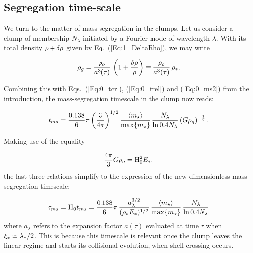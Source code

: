\subsection{Segregation time-scale} 
\label{Sec:Timescales} 
We turn to the matter of mass segregation in the clumps. Let us consider a clump of membership $N_\lambda$ initiated by a Fourier mode of wavelength $\lambda$. With its total density $\rho + \delta\rho$ given by Eq.~(\ref{Eq:1_DeltaRho}), we may write 

\begin{equation}
 \rho_g = \frac{\rho_o}{a^3(\tau)} \, \left( 1 + \frac{\delta\rho}{\rho} \right) \equiv  \frac{\rho_o}{a^3(\tau)} \, \rho_\ast.
 \end{equation}
 
Combining this with Eqs.~(\ref{Eq:0_tcr}), (\ref{Eq:0_trel}) and (\ref{Eq:0_ms2}) from the introduction, the mass-segregation timescale in the clump now reads:

\begin{equation}
 t_{ms} = \frac{0.138}{6}\pi \left(\frac{3}{4\pi}\right)^{1/2} \frac{\langle m_\star\rangle}{\max\{m_\star\}} \, \frac{N_\lambda}{\ln 0.4 N_\lambda} \, (G\rho_g)^{-\frac{1}{2}}\, . \end{equation}
  
Making use of the equality 

\begin{equation}
\frac{4\pi}{3} G\rho_o = {\textrm{H}}_0^2 E_\ast ,
\end{equation} 
the last three relations simplify to the expression of the new dimensionless mass-segregation timescale:

\begin{equation}\label{Eqn:Taums} 
\tau_{ms} = {\textrm{H}}_0 t_{ms} = \frac{0.138}{6} \pi \, \frac{a_\lambda^{3/2}}{(\rho_\ast E_\ast)^{1/2}} \, \frac{\langle m_\star\rangle}{\max\{m_\star\}} \, \frac{N_\lambda}{\ln 0.4 N_\lambda} 
\end{equation}
where $a_\lambda$ refers to the expansion factor $a(\tau)$ evaluated at time $\tau$ when $\xi_\ast \simeq \lambda_\ast/2$. This is because this timescale is relevant once the clump leaves the linear regime and starts its collisional evolution, when shell-crossing occurs.

